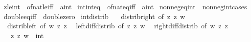\begin{isabellebody}
\isamarkupfalse%
\ zle{\isacharunderscore}{\kern0pt}int\ {\isacharequal}{\kern0pt}\ of{\isacharunderscore}{\kern0pt}nat{\isacharunderscore}{\kern0pt}le{\isacharunderscore}{\kern0pt}iff\ {\isacharbrackleft}{\kern0pt}\ {\isacharprime}{\kern0pt}a{\isacharequal}{\kern0pt}int{\isacharbrackright}{\kern0pt}\isanewline
{}\isamarkupfalse%
\ int{\isacharunderscore}{\kern0pt}int{\isacharunderscore}{\kern0pt}eq\ {\isacharequal}{\kern0pt}\ of{\isacharunderscore}{\kern0pt}nat{\isacharunderscore}{\kern0pt}eq{\isacharunderscore}{\kern0pt}iff\ {\isacharbrackleft}{\kern0pt}\ {\isacharprime}{\kern0pt}a{\isacharequal}{\kern0pt}int{\isacharbrackright}{\kern0pt}\isanewline
{}\isamarkupfalse%
\ nonneg{\isacharunderscore}{\kern0pt}eq{\isacharunderscore}{\kern0pt}int\ {\isacharequal}{\kern0pt}\ nonneg{\isacharunderscore}{\kern0pt}int{\isacharunderscore}{\kern0pt}cases\isanewline
{}\isamarkupfalse%
\ double{\isacharunderscore}{\kern0pt}eq{\isacharunderscore}{\kern0pt}{}{\isacharunderscore}{\kern0pt}iff\ {\isacharequal}{\kern0pt}\ double{\isacharunderscore}{\kern0pt}zero\isanewline
\isanewline
{}\isamarkupfalse%
\ int{\isacharunderscore}{\kern0pt}distrib\ {\isacharequal}{\kern0pt}\isanewline
\ \ distrib{\isacharunderscore}{\kern0pt}right\ {\isacharbrackleft}{\kern0pt}of\ z{}\ z{}\ w{\isacharbrackright}{\kern0pt}\isanewline
\ \ distrib{\isacharunderscore}{\kern0pt}left\ {\isacharbrackleft}{\kern0pt}of\ w\ z{}\ z{}{\isacharbrackright}{\kern0pt}\isanewline
\ \ left{\isacharunderscore}{\kern0pt}diff{\isacharunderscore}{\kern0pt}distrib\ {\isacharbrackleft}{\kern0pt}of\ z{}\ z{}\ w{\isacharbrackright}{\kern0pt}\isanewline
\ \ right{\isacharunderscore}{\kern0pt}diff{\isacharunderscore}{\kern0pt}distrib\ {\isacharbrackleft}{\kern0pt}of\ w\ z{}\ z{}{\isacharbrackright}{\kern0pt}\isanewline
\ \ \ z{}\ z{}\ w\ {\isacharcolon}{\kern0pt}{\isacharcolon}{\kern0pt}\ int\isanewline
%
\isadelimtheory
\isanewline
%
\endisadelimtheory
%
\isatagtheory
{}\isamarkupfalse%
%
\endisatagtheory
{\isafoldtheory}%
%
\isadelimtheory
%
\endisadelimtheory
%
\end{isabellebody}%
\endinput
